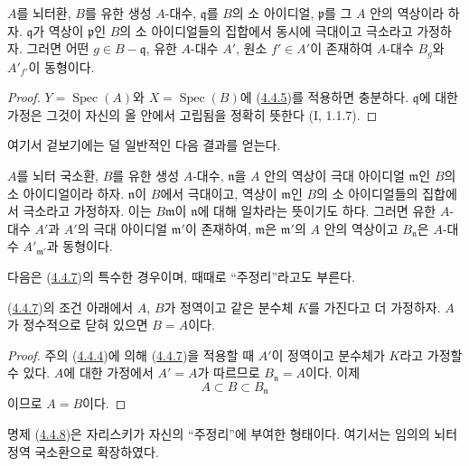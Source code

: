
\begin{corollary}[4.4.6]
\label{III.4.4.6-fr}
$A$를 뇌터환, $B$를 유한 생성 $A$-대수, $\mathfrak q$를 $B$의
소 아이디얼, $\mathfrak p$를 그 $A$ 안의 역상이라 하자.
$\mathfrak q$가 역상이 $\mathfrak p$인 $B$의 소 아이디얼들의
집합에서 동시에 극대이고 극소라고 가정하자. 그러면 어떤
$g\in B-\mathfrak q$, 유한 $A$-대수 $A'$, 원소 $f'\in A'$이
존재하여 $A$-대수 $B_g$와 $A'_{f'}$이 동형이다.
\end{corollary}

\begin{proof}
$Y=\operatorname{Spec}(A)$와 $X=\operatorname{Spec}(B)$에
(\hyperref[III.4.4.5-fr]{4.4.5})를 적용하면 충분하다.
$\mathfrak q$에 대한 가정은 그것이 자신의 올 안에서 고립됨을 정확히
뜻한다 (I, 1.1.7).
\end{proof}

여기서 겉보기에는 덜 일반적인 다음 결과를 얻는다.

\begin{corollary}[4.4.7]
\label{III.4.4.7-fr}
$A$를 뇌터 국소환, $B$를 유한 생성 $A$-대수, $\mathfrak n$을
$A$ 안의 역상이 극대 아이디얼 $\mathfrak m$인 $B$의 소
아이디얼이라 하자. $\mathfrak n$이 $B$에서 극대이고, 역상이
$\mathfrak m$인 $B$의 소 아이디얼들의 집합에서 극소라고 가정하자.
이는 $B\mathfrak m$이 $\mathfrak n$에 대해 일차라는 뜻이기도 하다.
그러면 유한 $A$-대수 $A'$과 $A'$의 극대 아이디얼
$\mathfrak m'$이 존재하여, $\mathfrak m$은 $\mathfrak m'$의
$A$ 안의 역상이고 $B_{\mathfrak n}$은 $A$-대수
$A'_{\mathfrak m'}$과 동형이다.
\end{corollary}

다음은 (\hyperref[III.4.4.7-fr]{4.4.7})의 특수한 경우이며,
때때로 “주정리”라고도 부른다.

\begin{corollary}[4.4.8]
\label{III.4.4.8-fr}
(\hyperref[III.4.4.7-fr]{4.4.7})의 조건 아래에서 $A$, $B$가
정역이고 같은 분수체 $K$를 가진다고 더 가정하자. $A$가 정수적으로
닫혀 있으면 $B=A$이다.
\end{corollary}

\begin{proof}
주의 (\hyperref[III.4.4.4-fr]{4.4.4})에 의해
(\hyperref[III.4.4.7-fr]{4.4.7})을 적용할 때 $A'$이 정역이고
분수체가 $K$라고 가정할 수 있다. $A$에 대한 가정에서
$A'=A$가 따르므로 $B_{\mathfrak n}=A$이다. 이제
\[
A\subset B\subset B_{\mathfrak n}
\]
이므로 $A=B$이다.
\end{proof}

명제 (\hyperref[III.4.4.8-fr]{4.4.8})은 자리스키가 자신의
“주정리”에 부여한 형태이다. 여기서는 임의의 뇌터 정역 국소환으로
확장하였다.

